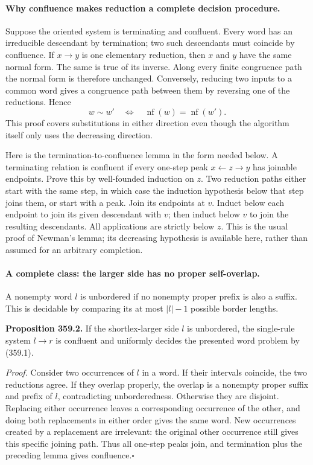 \documentclass[11pt]{article}
\begin{document}
\paragraph{Why confluence makes reduction a complete decision procedure.}
Suppose the oriented system is terminating and confluent. Every word
has an irreducible descendant by termination; two such descendants must
coincide by confluence. If $x\to y$ is one elementary reduction, then
$x$ and $y$ have the same normal form. The same is true of its inverse.
Along every finite congruence path the normal form is therefore unchanged.
Conversely, reducing two inputs to a common word gives a congruence path
between them by reversing one of the reductions. Hence
\[
 w\sim w'\quad\Longleftrightarrow\quad
 \operatorname{nf}(w)=\operatorname{nf}(w').
 \tag{359.1}
\]
This proof covers substitutions in either direction even though the
algorithm itself only uses the decreasing direction.

Here is the termination-to-confluence lemma in the form needed below.
A terminating relation is confluent if every one-step peak
$x\leftarrow z\to y$ has joinable endpoints. Prove this by well-founded
induction on $z$. Two reduction paths either start with the same step,
in which case the induction hypothesis below that step joins them, or
start with a peak. Join its endpoints at $v$. Induct below each endpoint
to join its given descendant with $v$; then induct below $v$ to join
the resulting descendants. All applications are strictly below $z$.
This is the usual proof of Newman's lemma; its decreasing hypothesis
is available here, rather than assumed for an arbitrary completion.

\paragraph{A complete class: the larger side has no proper self-overlap.}
A nonempty word $l$ is unbordered if no nonempty proper prefix is also
a suffix. This is decidable by comparing its at most $|l|-1$ possible
border lengths.

\textbf{Proposition 359.2.} If the shortlex-larger side $l$ is unbordered,
the single-rule system $l\to r$ is confluent and uniformly decides
the presented word problem by (359.1).

\emph{Proof.} Consider two occurrences of $l$ in a word. If their
intervals coincide, the two reductions agree. If they overlap properly,
the overlap is a nonempty proper suffix and prefix of $l$, contradicting
unborderedness. Otherwise they are disjoint. Replacing either occurrence
leaves a corresponding occurrence of the other, and doing both replacements
in either order gives the same word. New occurrences created by a
replacement are irrelevant: the original other occurrence still gives
this specific joining path. Thus all one-step peaks join, and termination
plus the preceding lemma gives confluence.\hfill$\square$
\end{document}
